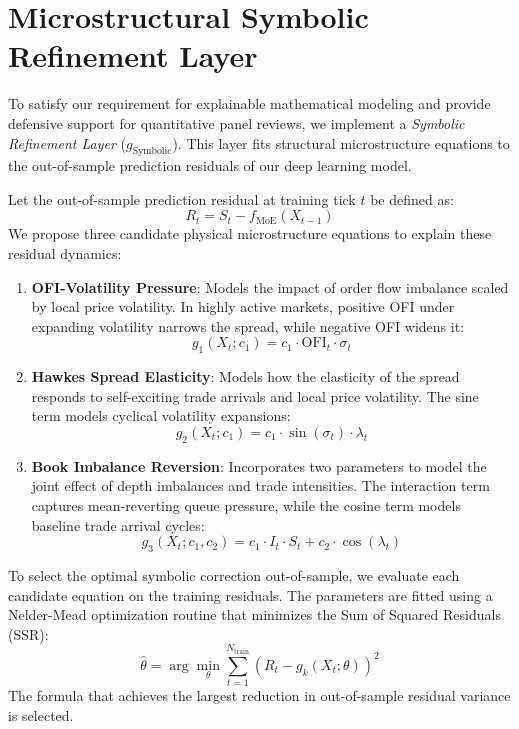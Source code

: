 \documentclass[11pt,a4paper]{article}
\begin{document}
\section{Microstructural Symbolic Refinement Layer}
To satisfy our requirement for explainable mathematical modeling and provide defensive support for quantitative panel reviews, we implement a \textit{Symbolic Refinement Layer} ($g_{\text{Symbolic}}$). This layer fits structural microstructure equations to the out-of-sample prediction residuals of our deep learning model.

Let the out-of-sample prediction residual at training tick $t$ be defined as:
\begin{equation}
    R_t = S_t - f_{\text{MoE}}(X_{t-1})
\end{equation}
We propose three candidate physical microstructure equations to explain these residual dynamics:

\begin{enumerate}
    \item \textbf{OFI-Volatility Pressure}: Models the impact of order flow imbalance scaled by local price volatility. In highly active markets, positive OFI under expanding volatility narrows the spread, while negative OFI widens it:
    \begin{equation}
        g_1(X_t; c_1) = c_1 \cdot \text{OFI}_t \cdot \sigma_t
    \end{equation}
    
    \item \textbf{Hawkes Spread Elasticity}: Models how the elasticity of the spread responds to self-exciting trade arrivals and local price volatility. The sine term models cyclical volatility expansions:
    \begin{equation}
        g_2(X_t; c_1) = c_1 \cdot \sin(\sigma_t) \cdot \lambda_t
    \end{equation}
    
    \item \textbf{Book Imbalance Reversion}: Incorporates two parameters to model the joint effect of depth imbalances and trade intensities. The interaction term captures mean-reverting queue pressure, while the cosine term models baseline trade arrival cycles:
    \begin{equation}
        g_3(X_t; c_1, c_2) = c_1 \cdot I_t \cdot S_t + c_2 \cdot \cos(\lambda_t)
    \end{equation}
\end{enumerate}

To select the optimal symbolic correction out-of-sample, we evaluate each candidate equation on the training residuals. The parameters are fitted using a Nelder-Mead optimization routine that minimizes the Sum of Squared Residuals (SSR):
\begin{equation}
    \hat{\theta} = \arg\min_{\theta} \sum_{t=1}^{N_{\text{train}}} \left( R_t - g_k(X_t; \theta) \right)^2
\end{equation}
The formula that achieves the largest reduction in out-of-sample residual variance is selected.
\end{document}
